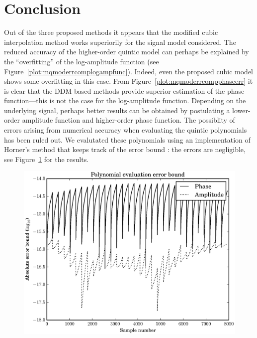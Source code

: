 \section{Conclusion}

Out of the three proposed methods it appears that the modified cubic
interpolation method works superiorily for the signal model considered. The
reduced accuracy of the higher-order quintic model can perhaps be explained by
the ``overfitting'' of the log-amplitude function (see
Figure~\ref{plot:mqmoderrcomplogampfunc}). Indeed, even the proposed cubic model
shows some overfitting in this case. From Figure~\ref{plot:mqmoderrcompphaseerr}
it is clear that the DDM based methods provide superior estimation of the phase
function---this is not the case for the log-amplitude function. Depending on
the underlying signal, perhaps better results can be obtained by postulating a
lower-order amplitude function and higher-order phase function. The possiblity
of errors arising from numerical accuracy when evaluating the quintic
polynomials has been ruled out. We evalutated these polynomials using an
implementation of Horner's method that keeps track of the error bound
\cite[p.~95]{higham2002accuracy}: the
errors are negligible, see Figure~\ref{plot:mqmodquinticpolyevalerr} for the
results.

\begin{figure}[!t]
    \includegraphics[width=\textwidth]{plots/mq_mod_quintic_poly_eval_err.eps}
    \caption{\label{plot:mqmodquinticpolyevalerr}}
\end{figure}
